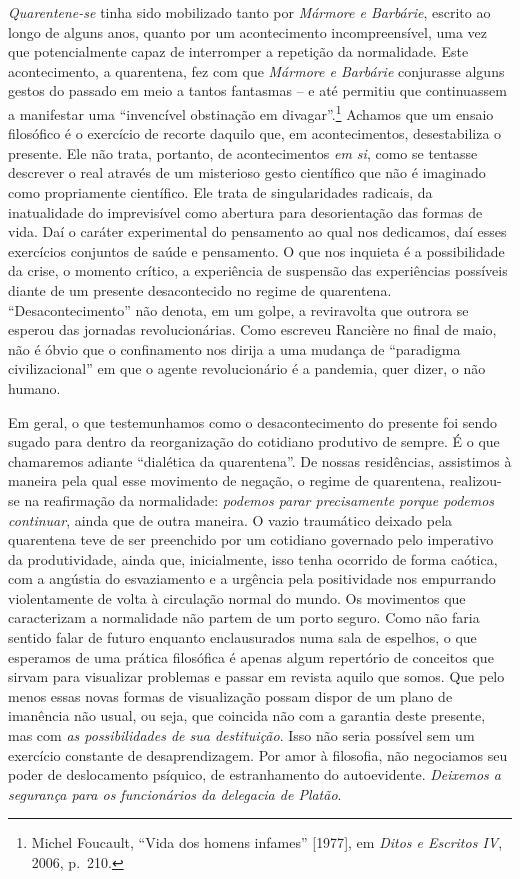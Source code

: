 \emph{Quarentene-se} tinha sido mobilizado tanto por \emph{Mármore e
Barbárie}, escrito ao longo de alguns anos, quanto por um acontecimento
incompreensível, uma vez que potencialmente capaz de interromper a
repetição da normalidade. Este acontecimento, a quarentena, fez com que
\emph{Mármore e Barbárie} conjurasse alguns gestos do passado em meio a
tantos fantasmas -- e até permitiu que continuassem a manifestar uma
``invencível obstinação em divagar''.\footnote{Michel Foucault, ``Vida
  dos homens infames'' {[}1977{]}, em \emph{Ditos e Escritos IV}, 2006,
  p.~210.} Achamos que um ensaio filosófico é o exercício de recorte
daquilo que, em acontecimentos, desestabiliza o presente. Ele não trata,
portanto, de acontecimentos \emph{em si}, como se tentasse descrever o
real através de um misterioso gesto científico que não é imaginado como
propriamente científico. Ele trata de singularidades radicais, da
inatualidade do imprevisível como abertura para desorientação das formas
de vida. Daí o caráter experimental do pensamento ao qual nos dedicamos,
daí esses exercícios conjuntos de saúde e pensamento. O que nos inquieta
é a possibilidade da crise, o momento crítico, a experiência de
suspensão das experiências possíveis diante de um presente desacontecido
no regime de quarentena. ``Desacontecimento'' não denota, em um golpe, a
reviravolta que outrora se esperou das jornadas revolucionárias. Como
escreveu Rancière no final de maio, não é óbvio que o confinamento nos
dirija a uma mudança de ``paradigma civilizacional'' em que o agente
revolucionário é a pandemia, quer dizer, o não humano.~

Em geral, o que testemunhamos como o desacontecimento do presente foi
sendo sugado para dentro da reorganização do cotidiano produtivo de
sempre. É o que chamaremos adiante ``dialética da quarentena''. De
nossas residências, assistimos à maneira pela qual esse movimento de
negação, o regime de quarentena, realizou-se na reafirmação da
normalidade: \emph{podemos parar precisamente porque podemos continuar},
ainda que de outra maneira. O vazio traumático deixado pela quarentena
teve de ser preenchido por um cotidiano governado pelo imperativo da
produtividade, ainda que, inicialmente, isso tenha ocorrido de forma
caótica, com a angústia do esvaziamento e a urgência pela positividade
nos empurrando violentamente de volta à circulação normal do mundo. Os
movimentos que caracterizam a normalidade não partem de um porto seguro.
Como não faria sentido falar de futuro enquanto enclausurados numa sala
de espelhos, o que esperamos de uma prática filosófica é apenas algum
repertório de conceitos que sirvam para visualizar problemas e passar em
revista aquilo que somos. Que pelo menos essas novas formas de
visualização possam dispor de um plano de imanência não usual, ou seja,
que coincida não com a garantia deste presente, mas com \emph{as
possibilidades de sua destituição}. Isso não seria possível sem um
exercício constante de desaprendizagem. Por amor à filosofia, não
negociamos seu poder de deslocamento psíquico, de estranhamento do
autoevidente. \emph{Deixemos a segurança para os funcionários da
delegacia de Platão}.


